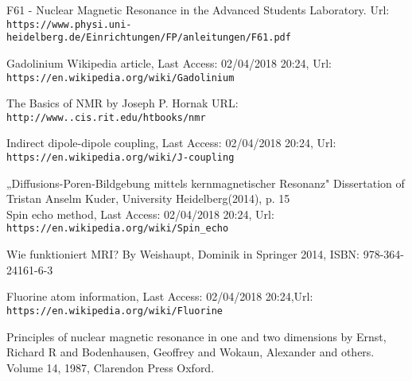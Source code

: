 
	


	

	\maketitle
	
	
	
	
	
	
	
	\begin{thebibliography}{9}
		F61 - Nuclear Magnetic Resonance in the Advanced Students Laboratory. Url: \\\texttt{https://www.physi.uni-heidelberg.de/Einrichtungen/FP/anleitungen/F61.pdf}
	
		Gadolinium Wikipedia article, Last Access: 02/04/2018 20:24, Url: \\
		\texttt{https://en.wikipedia.org/wiki/Gadolinium}
		
			
		The Basics of NMR by Joseph P. Hornak
		URL: \\\texttt{http://www..cis.rit.edu/htbooks/nmr}
		
		
		Indirect dipole-dipole coupling, Last Access: 02/04/2018 20:24, Url: \\
		\texttt{https://en.wikipedia.org/wiki/J-coupling}
		
		„Diffusions-Poren-Bildgebung mittels kernmagnetischer Resonanz"
		Dissertation of Tristan Anselm Kuder, University Heidelberg(2014), p. 15\\
		
		Spin echo method, Last Access: 02/04/2018 20:24, Url: \\
		\texttt{https://en.wikipedia.org/wiki/Spin\_echo}
		
		Wie funktioniert MRI? By Weishaupt, Dominik in Springer 2014, ISBN: 978-364-24161-6-3

		Fluorine atom information, Last Access: 02/04/2018 20:24,Url: \\
		\texttt{https://en.wikipedia.org/wiki/Fluorine}
		
		Principles of nuclear magnetic resonance in one and two dimensions by 
		Ernst, Richard R and Bodenhausen, Geoffrey and Wokaun, Alexander and others. Volume 14, 1987, Clarendon Press Oxford.
		
	\end{thebibliography}
	
